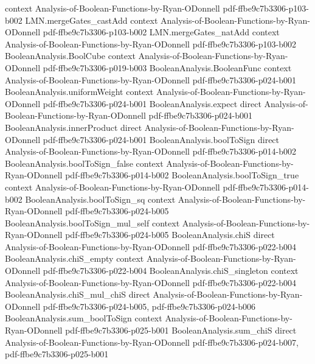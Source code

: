 \begin{lemma}
  {context}
  {Analysis-of-Boolean-Functions-by-Ryan-ODonnell}
  {pdf-ffbe9c7b3306-p103-b002}
\proofstep
  {LMN.mergeGates_castAdd}
  {context}
  {Analysis-of-Boolean-Functions-by-Ryan-ODonnell}
  {pdf-ffbe9c7b3306-p103-b002}
\proofstep
  {LMN.mergeGates_natAdd}
  {context}
  {Analysis-of-Boolean-Functions-by-Ryan-ODonnell}
  {pdf-ffbe9c7b3306-p103-b002}
\proofstep
  {BooleanAnalysis.BoolCube}
  {context}
  {Analysis-of-Boolean-Functions-by-Ryan-ODonnell}
  {pdf-ffbe9c7b3306-p019-b003}
\proofstep
  {BooleanAnalysis.BooleanFunc}
  {context}
  {Analysis-of-Boolean-Functions-by-Ryan-ODonnell}
  {pdf-ffbe9c7b3306-p024-b001}
\proofstep
  {BooleanAnalysis.uniformWeight}
  {context}
  {Analysis-of-Boolean-Functions-by-Ryan-ODonnell}
  {pdf-ffbe9c7b3306-p024-b001}
\proofstep
  {BooleanAnalysis.expect}
  {direct}
  {Analysis-of-Boolean-Functions-by-Ryan-ODonnell}
  {pdf-ffbe9c7b3306-p024-b001}
\proofstep
  {BooleanAnalysis.innerProduct}
  {direct}
  {Analysis-of-Boolean-Functions-by-Ryan-ODonnell}
  {pdf-ffbe9c7b3306-p024-b001}
\proofstep
  {BooleanAnalysis.boolToSign}
  {direct}
  {Analysis-of-Boolean-Functions-by-Ryan-ODonnell}
  {pdf-ffbe9c7b3306-p014-b002}
\proofstep
  {BooleanAnalysis.boolToSign_false}
  {context}
  {Analysis-of-Boolean-Functions-by-Ryan-ODonnell}
  {pdf-ffbe9c7b3306-p014-b002}
\proofstep
  {BooleanAnalysis.boolToSign_true}
  {context}
  {Analysis-of-Boolean-Functions-by-Ryan-ODonnell}
  {pdf-ffbe9c7b3306-p014-b002}
\proofstep
  {BooleanAnalysis.boolToSign_sq}
  {context}
  {Analysis-of-Boolean-Functions-by-Ryan-ODonnell}
  {pdf-ffbe9c7b3306-p024-b005}
\proofstep
  {BooleanAnalysis.boolToSign_mul_self}
  {context}
  {Analysis-of-Boolean-Functions-by-Ryan-ODonnell}
  {pdf-ffbe9c7b3306-p024-b005}
\proofstep
  {BooleanAnalysis.chiS}
  {direct}
  {Analysis-of-Boolean-Functions-by-Ryan-ODonnell}
  {pdf-ffbe9c7b3306-p022-b004}
\proofstep
  {BooleanAnalysis.chiS_empty}
  {context}
  {Analysis-of-Boolean-Functions-by-Ryan-ODonnell}
  {pdf-ffbe9c7b3306-p022-b004}
\proofstep
  {BooleanAnalysis.chiS_singleton}
  {context}
  {Analysis-of-Boolean-Functions-by-Ryan-ODonnell}
  {pdf-ffbe9c7b3306-p022-b004}
\proofstep
  {BooleanAnalysis.chiS_mul_chiS}
  {direct}
  {Analysis-of-Boolean-Functions-by-Ryan-ODonnell}
  {pdf-ffbe9c7b3306-p024-b005,
    pdf-ffbe9c7b3306-p024-b006}
\proofstep
  {BooleanAnalysis.sum_boolToSign}
  {context}
  {Analysis-of-Boolean-Functions-by-Ryan-ODonnell}
  {pdf-ffbe9c7b3306-p025-b001}
\proofstep
  {BooleanAnalysis.sum_chiS}
  {direct}
  {Analysis-of-Boolean-Functions-by-Ryan-ODonnell}
  {pdf-ffbe9c7b3306-p024-b007,
    pdf-ffbe9c7b3306-p025-b001}

\end{lemma}
